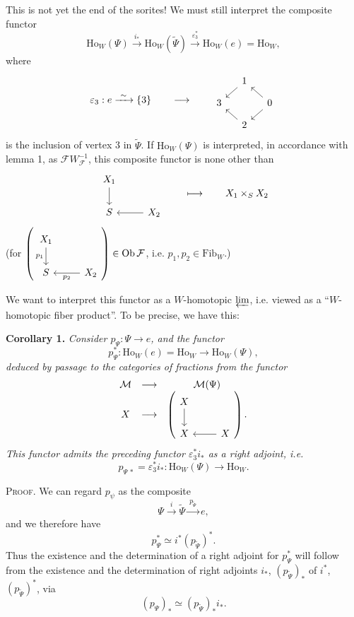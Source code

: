 \documentclass[11pt]{article}
\newcommand{\printedpage}[1]{\marginpar{\footnotesize p.~#1}}
\newcommand{\msp}[1]{\marginpar{\footnotesize [#1]}}
\newcommand{\Ho}{\mathrm{Ho}}
\newcommand{\Fib}{\mathrm{Fib}}
\begin{document}
This is not yet the end of the sorites! We must still interpret the composite functor
\[
\Ho_W(\Psi)\xrightarrow{\ i_*\ }\Ho_W(\tilde{\Psi})\xrightarrow{\ \varepsilon_3^*\ }\Ho_W(e)=\Ho_W,
\]
where
\[
\varepsilon_3 : e\xrightarrow{\ \sim\ }\{3\}
\qquad\longrightarrow\qquad
\begin{tikzcd}[ampersand replacement=\&, column sep=small, row sep=small]
\& 1 \arrow[dl] \& \\
3 \& \& 0 \arrow[ul] \arrow[dl] \\
\& 2 \arrow[ul] \&
\end{tikzcd}
\]
is the inclusion of vertex 3 in $\tilde{\Psi}$. If $\Ho_W(\Psi)$ is interpreted, in accordance with lemma 1, as $\mathcal{F}W_{\mathcal{F}}^{-1}$, this composite functor is none other than
\[
\begin{tikzcd}[ampersand replacement=\&]
X_1 \arrow[d] \& \\
S \& X_2 \arrow[l]
\end{tikzcd}
\qquad\longmapsto\qquad X_1\times_S X_2
\]
\printedpage{166}
(for $\left(\begin{tikzcd}[ampersand replacement=\&] X_1 \arrow[d, "p_1"'] \& \\ S \& X_2 \arrow[l, "p_2"] \end{tikzcd}\right)\in \mathrm{Ob}\,\mathcal{F}$, i.e. $p_1,p_2\in\Fib_W$.)

We want to interpret this functor as a $W$-homotopic $\varprojlim$, i.e. viewed as a ``$W$-homotopic fiber product''. To be precise, we have this:

\msp{page 256}
\textbf{Corollary 1.} \textit{Consider $p_\Psi : \Psi\longrightarrow e$, and the functor}
\[
p_\Psi^* : \Ho_W(e)=\Ho_W\longrightarrow\Ho_W(\Psi),
\]
\textit{deduced by passage to the categories of fractions from the functor}
\[
\begin{array}{ccc}
\mathcal{M} & \longrightarrow & \mathcal{M}(\Psi) \\
X & \longrightarrow & \left(
\begin{tikzcd}[ampersand replacement=\&]
X \arrow[d] \& \\
X \& X \arrow[l]
\end{tikzcd}
\right).
\end{array}
\]
\textit{This functor admits the preceding functor $\varepsilon_3^*i_*$ as a right adjoint, i.e.}
\[
p_{\Psi\,*}=\varepsilon_3^*i_* : \Ho_W(\Psi)\longrightarrow\Ho_W.
\]

\textsc{Proof}. We can regard $p_\psi$ as the composite %
\[
\Psi\xrightarrow{\ i\ }\tilde{\Psi}\xrightarrow{\ p_{\tilde{\Psi}}\ }e,
\]
and we therefore have
\[
p_\Psi^*\simeq i^*(p_{\tilde{\Psi}})^*.
\]
Thus the existence and the determination of a right adjoint for $p_\Psi^*$ will follow from the existence and the determination of right adjoints $i_*$, $(p_{\tilde{\Psi}})_*$ of $i^*$, $(p_{\tilde{\Psi}})^*$, via
\[
(p_\Psi)_*\simeq(p_{\tilde{\Psi}})_*i_*.
\]
\end{document}
